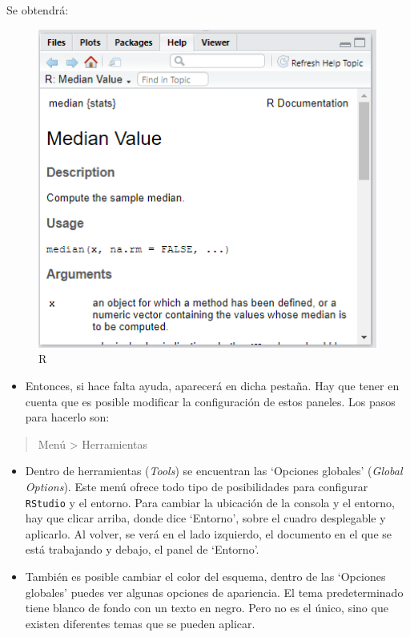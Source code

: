\documentclass[
]{article}
\providecommand{\tightlist}{%
  \setlength{\itemsep}{0pt}\setlength{\parskip}{0pt}}
\begin{document}
Se obtendrá:

\begin{figure}

{\centering \includegraphics[width=0.6\linewidth]{imagenes/ayuda} 

}

\caption{R}\label{fig:unnamed-chunk-144}
\end{figure}

\begin{itemize}
\tightlist
\item
  Entonces, si hace falta ayuda, aparecerá en dicha pestaña. Hay que tener en cuenta que es posible modificar la configuración de estos paneles. Los pasos para hacerlo son:
\end{itemize}

\begin{quote}
Menú \textgreater{} Herramientas
\end{quote}

\begin{itemize}
\item
  Dentro de herramientas (\emph{Tools}) se encuentran las `Opciones globales' (\emph{Global Options}). Este menú ofrece todo tipo de posibilidades para configurar \texttt{RStudio} y el entorno. Para cambiar la ubicación de la consola y el entorno, hay que clicar arriba, donde dice `Entorno', sobre el cuadro desplegable y aplicarlo. Al volver, se verá en el lado izquierdo, el documento en el que se está trabajando y debajo, el panel de `Entorno'.
\item
  También es posible cambiar el color del esquema, dentro de las `Opciones globales' puedes ver algunas opciones de apariencia. El tema predeterminado tiene blanco de fondo con un texto en negro. Pero no es el único, sino que existen diferentes temas que se pueden aplicar.
\end{itemize}
\end{document}
